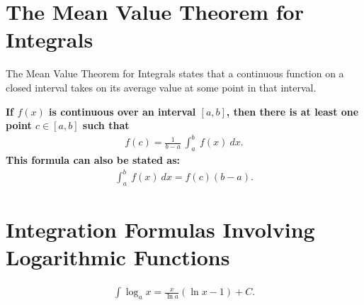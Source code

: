 \documentclass{report}
\begin{document}
    \pagebreak \bigbreak \noindent 
    \section{\LARGE The Mean Value Theorem for Integrals}
    \bigbreak \noindent 
    The Mean Value Theorem for Integrals states that a continuous function on a closed interval takes on its average value at some point in that interval.
    \smallbreak \noindent
    \begin{definition} 
        \textbf{If $f(x)$ is continuous over an interval $[a,b]$, then there is at least one point  $c \in [a,b] $ such that
            \begin{align*}
                f(c) = \frac{1}{b-a}\ \int_{a}^{b}\ f(x)\ dx
            .\end{align*}
        This formula can also be stated as:
        \begin{align*}
            \int_{a}^{b}\ f(x)\ dx = f(c)(b-a)
        .\end{align*}
        } 

    \end{definition}
    \bigbreak \noindent \bigbreak \noindent 
    \section{\LARGE Integration Formulas Involving Logarithmic Functions}
    \bigbreak \noindent 
    \begin{align*}
        \int \log_{a}{x} = \frac{x}{\ln{a}}(\ln{x}-1) + C
    .\end{align*}





    
    
\end{document}
